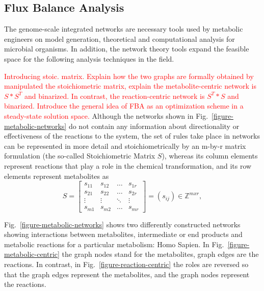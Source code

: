 \subsection{Flux Balance Analysis}
The genome-scale integrated networks are necessary tools used by metabolic engineers on model generation, theoretical and computational analysis for microbial organisms. In addition, the network theory tools expand the feasible space for the following analysis techniques in the field. 

\textcolor{red}{Introducing stoic. matrix. Explain how the two graphs are formally obtained by manipulated the stoichiometric matrix, explain the metabolite-centric network is $S*S^{T}$ and binarized. In contrast, the reaction-centric network is $S^{T}*S$ and binarized. Introduce the general idea of FBA as an optimization scheme in a steady-state solution space.}
Although the networks shown in Fig.~\ref{figure-metabolic-networks} do not contain any information about directionality or effectiveness of the reactions to the system, the set of rules take place in networks can be represented in more detail and stoichiometrically by an m-by-r matrix formulation (the so-called Stoichiometric Matrix $S$), whereas its column elements represent reactions that play a role in the chemical transformation, and its row elements represent metabolites as
\begin{equation} \tag{1}
	S =  \begin{bmatrix} 
		s_{11} & s_{12} & \dots  & s_{1r}\\
		s_{21} & s_{22} & \dots  & s_{2r}\\
		\vdots & \vdots &\ddots & \vdots \\
		s_{m1} & s_{m2} & \dots & s_{mr} 
	\end{bmatrix}=(s_{ij})\in \mathbb{Z}^{mxr},
	\label{stoichio}
\end{equation}

Fig.~\ref{figure-metabolic-networks} shows two differently constructed networks showing interactions between metabolites, intermediate or end products and metabolic reactions for a particular metabolism: Homo Sapien. In Fig.~\ref{figure-metabolic-centric} the graph nodes stand for the metabolites, graph edges are the reactions. In contrast, in Fig.~\ref{figure-reaction-centric} the roles are reversed so that the graph edges represent the metabolites, and the graph nodes represent the reactions.



